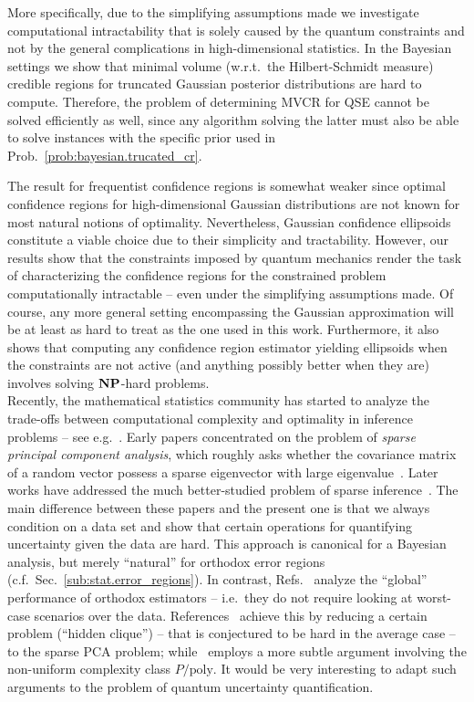 More specifically, due to the simplifying assumptions made we investigate computational intractability that is solely caused by the quantum constraints and not by the general complications in high-dimensional statistics.
In the Bayesian settings we show that minimal volume (w.r.t.\ the Hilbert-Schmidt measure) credible regions for truncated Gaussian posterior distributions are hard to compute.
Therefore, the problem of determining MVCR for QSE cannot be solved efficiently as well, since any algorithm solving the latter must also be able to solve instances with the specific prior used in Prob.~\ref{prob:bayesian.trucated_cr}.

The result for frequentist confidence regions is somewhat weaker since optimal confidence regions for high-dimensional Gaussian distributions are not known for most natural notions of optimality.
Nevertheless, Gaussian confidence ellipsoids constitute a viable choice due to their simplicity and tractability.
However, our results show that the constraints imposed by quantum mechanics render the task of characterizing the confidence regions for the constrained problem computationally intractable -- even under the simplifying assumptions made.
Of course, any more general setting encompassing the Gaussian approximation will be at least as hard to treat as the one used in this work.
Furthermore, it also shows that computing any confidence region estimator yielding ellipsoids when the constraints are not active (and anything possibly better when they are) involves solving $\mathbf{NP}$-hard problems.\\


Recently, the mathematical statistics community has started to analyze the trade-offs between computational complexity and optimality in inference problems -- see e.g.\
\cite{Berthet_2013_Complexity,Berthet_2013_Computational,Zhang_2014_Lower}.
Early papers concentrated on the problem of \emph{sparse principal component analysis}, which roughly asks whether the covariance matrix of a random vector possess a sparse eigenvector with large eigenvalue~\cite{Berthet_2013_Complexity,Berthet_2013_Computational,Zhang_2014_Lower}.
Later works have addressed the much better-studied problem of sparse inference~\cite{Zhang_2014_Lower}.
The main difference between these papers and the present one is that we always condition on a data set and show that certain operations for quantifying uncertainty given the data are hard.
This approach is canonical for a Bayesian analysis, but merely ``natural'' for orthodox error regions (c.f.~Sec.~\ref{sub:stat.error_regions}).
In contrast, Refs.~\cite{Berthet_2013_Complexity,Berthet_2013_Computational,Zhang_2014_Lower} analyze the ``global'' performance of orthodox estimators -- i.e.\ they do not require looking at worst-case scenarios over the data.
References~\cite{Berthet_2013_Complexity,Berthet_2013_Computational,Zhang_2014_Lower} achieve this by reducing a certain problem (``hidden clique'') -- that is conjectured to be hard in the average case -- to the sparse PCA problem; while~\cite{Zhang_2014_Lower} employs a more subtle argument involving the non-uniform complexity class $P/\mathrm{poly}$.
It would be very interesting to adapt such arguments to the problem of quantum uncertainty quantification.


